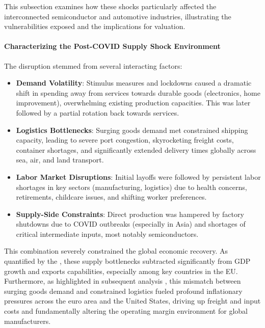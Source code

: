 This subsection examines how these shocks particularly affected the interconnected semiconductor and automotive industries, illustrating the vulnerabilities exposed and the implications for valuation.

\paragraph{Characterizing the Post-COVID Supply Shock Environment}
The disruption stemmed from several interacting factors:
\begin{itemize}
    \item \textbf{Demand Volatility}: Stimulus measures and lockdowns caused a dramatic shift in spending away from services towards durable goods (electronics, home improvement), overwhelming existing production capacities. This was later followed by a partial rotation back towards services.
    \item \textbf{Logistics Bottlenecks}: Surging goods demand met constrained shipping capacity, leading to severe port congestion, skyrocketing freight costs, container shortages, and significantly extended delivery times globally across sea, air, and land transport.
    \item \textbf{Labor Market Disruptions}: Initial layoffs were followed by persistent labor shortages in key sectors (manufacturing, logistics) due to health concerns, retirements, childcare issues, and shifting worker preferences.
    \item \textbf{Supply-Side Constraints}: Direct production was hampered by factory shutdowns due to COVID outbreaks (especially in Asia) and shortages of critical intermediate inputs, most notably semiconductors.
\end{itemize}

This combination severely constrained the global economic recovery. As quantified by the \textcite{ecb2021trade}, these supply bottlenecks subtracted significantly from GDP growth and exports capabilities, especially among key countries in the EU. Furthermore, as highlighted in subsequent analysis \parencite{ecb2022bottlenecks}, this mismatch between surging goods demand and constrained logistics fueled profound inflationary pressures across the euro area and the United States, driving up freight and input costs and fundamentally altering the operating margin environment for global manufacturers.

